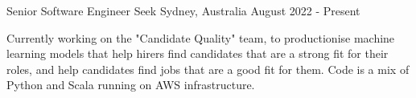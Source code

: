 


\begin{cventries}


\cventry
{Senior Software Engineer} %
{Seek} %
{Sydney, Australia} %
{August 2022 - Present} %
{ %
\begin{cvitems}
  \item {Currently working on the "Candidate Quality" team, to productionise machine learning models that help hirers find candidates that are a strong fit for their roles, and help candidates find jobs that are a good fit for them. Code is a mix of Python and Scala running on AWS infrastructure.}
\end{cvitems}
\vspace{2.0mm}
}



\end{cventries}
